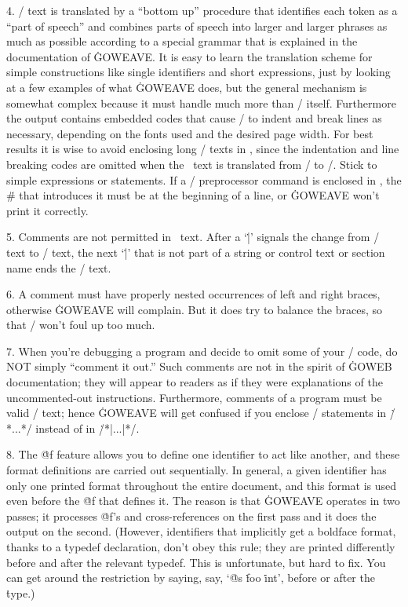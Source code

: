 4. \GO/ text is translated by a ``bottom up'' procedure that
identifies each token as a ``part of speech'' and combines parts of speech
into larger and larger phrases as much as possible according to a special
grammar that is explained in the documentation of \.{GOWEAVE}. It is easy to
learn the translation scheme for simple constructions like single
identifiers and short expressions, just by looking at a few examples of
what \.{GOWEAVE} does, but the general mechanism is somewhat complex because
it must handle much more than \GO/ itself. Furthermore the output
contains embedded codes that cause \TEX/ to indent and break lines as
necessary, depending on the fonts used and the desired page width. For
best results it is wise to avoid enclosing long \GO/ texts in \pb, since the
indentation and line breaking codes are omitted when the \pb\ text is
translated from \GO/ to \TEX/. Stick to simple expressions or
statements.  If a \GO/ preprocessor command is enclosed in \pb,
the \.\# that introduces it must be at the beginning of a line,
or \.{GOWEAVE} won't print it correctly.

5. Comments are not permitted in \pb\ text. After a `\.|'
signals the change from \TEX/ text to \GO/ text, the next `\.|' that is
not part of a string or control text or section name ends the \GO/ text.

6. A comment must have properly nested occurrences of left and right
braces, otherwise \.{GOWEAVE} will complain. But it
does try to balance the braces, so that \TEX/ won't foul up too much.

7. When you're debugging a program and decide to omit some of your
\GO/ code, do NOT simply ``comment it out.'' Such comments are not
in the spirit of \.{GOWEB} documentation; they will appear to readers
as if they were explanations of the uncommented-out instructions.
Furthermore, comments of a program must be valid \TEX/ text; hence
\.{GOWEAVE} will get confused if you enclose \GO/ statements in
\.{/*...*/} instead of in \.{/*|...|*/}. 

8. The \.{@f} feature allows you to define one identifier to act like
another, and these format definitions are carried out sequentially.
In general, a given identifier has only one printed format
throughout the entire document, and this format is used even before
the \.{@f} that defines it. The reason is that \.{GOWEAVE} operates in two
passes; it processes \.{@f}'s and cross-references on the first pass and
it does the output on the second.  (However, identifiers that
implicitly get a boldface format, thanks to a \.{typedef} declaration,
don't obey this rule; they are printed differently before and after
the relevant \.{typedef}.  This is unfortunate, but hard to fix. You can
get around the restriction by saying, say, `\.{@s} \.{foo} \.{int}',
before or after the \.{type}.)

